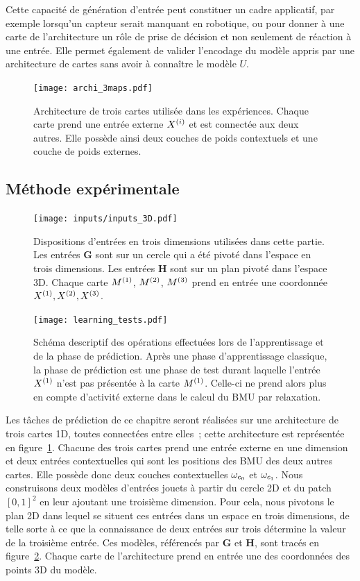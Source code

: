 \documentclass[../main]{subfiles}
\begin{document}
Cette capacité de génération d'entrée peut constituer un cadre applicatif, par exemple lorsqu'un capteur serait manquant en robotique, ou pour donner à une carte de l'architecture un rôle de prise de décision et non seulement de réaction à une entrée. Elle permet également de valider l'encodage du modèle appris par une architecture de cartes sans avoir à connaître le modèle $U$.

\begin{figure}
	\centering\texttt{[image: archi\_3maps.pdf]}
	\vspace{-0.5cm}
	\caption{Architecture de trois cartes utilisée dans les expériences. Chaque carte prend une entrée externe $X^{({i})}$ et est connectée aux deux autres. Elle possède ainsi deux couches de poids contextuels et une couche de poids externes.\label{fig:archi_3maps}}
\end{figure}

\subsection{Méthode expérimentale}
\begin{figure}
	\texttt{[image: inputs/inputs\_3D.pdf]}
	\caption{Dispositions d'entrées en trois dimensions utilisées dans cette partie. Les entrées \textbf{G} sont sur un cercle qui a été pivoté dans l'espace en trois dimensions. Les entrées \textbf{H} sont sur un plan pivoté dans l'espace 3D.
	Chaque carte $M^{({1})}$, $M^{({2})}$, $M^{({3})}$ prend en entrée une coordonnée $X^{({1})}, X^{({2})}, X^{({3})}$. \label{fig:inputs_3D}}
\end{figure}
\begin{figure}
	\texttt{[image: learning\_tests.pdf]}
	\caption{Schéma descriptif des opérations effectuées lors de l'apprentissage et de la phase de prédiction. Après une phase d'apprentissage classique, la phase de prédiction est une phase de test durant laquelle l'entrée $X^{({1})}$ n'est pas présentée à la carte $M^{({1})}$. Celle-ci ne prend alors plus en compte d'activité externe dans le calcul du BMU par relaxation. \label{fig:schema_pred}}
\end{figure}


Les tâches de prédiction de ce chapitre seront réalisées sur une architecture de trois cartes 1D, toutes connectées entre elles~; cette architecture est représentée en figure~\ref{fig:archi_3maps}.
Chacune des trois cartes prend une entrée externe en une dimension et deux entrées contextuelles qui sont les positions des BMU des deux autres cartes. Elle possède donc deux couches contextuelles $\omega_{c_0}$ et $\omega_{c_1}$.
Nous construisons deux modèles d'entrées jouets à partir du cercle 2D et du patch $[0,1]^2$ en leur ajoutant une troisième dimension. Pour cela, nous pivotons le plan 2D dans lequel se situent ces entrées dans un espace en trois dimensions, de telle sorte à ce que la connaissance de deux entrées sur trois détermine la valeur de la troisième entrée. 
Ces modèles, référencés par \textbf{G} et \textbf{H}, sont tracés en figure~\ref{fig:inputs_3D}.
Chaque carte de l'architecture prend en entrée une des coordonnées des points 3D du modèle.
\end{document}
